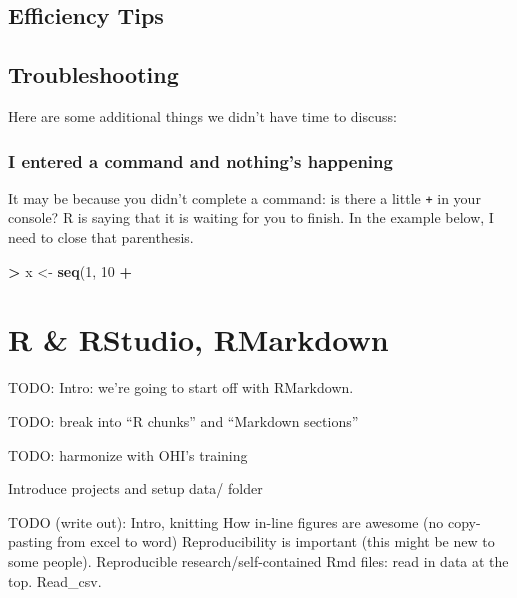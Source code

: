 \documentclass[]{book}
\newenvironment{Shaded}{\begin{snugshade}}{\end{snugshade}}
\newcommand{\DecValTok}[1]{\textcolor[rgb]{0.00,0.00,0.81}{#1}}
\newcommand{\KeywordTok}[1]{\textcolor[rgb]{0.13,0.29,0.53}{\textbf{#1}}}
\newcommand{\NormalTok}[1]{#1}
\newcommand{\OperatorTok}[1]{\textcolor[rgb]{0.81,0.36,0.00}{\textbf{#1}}}
\newcommand{\StringTok}[1]{\textcolor[rgb]{0.31,0.60,0.02}{#1}}
\begin{document}
\hypertarget{efficiency-tips}{%
\section{Efficiency Tips}\label{efficiency-tips}}

\hypertarget{troubleshooting}{%
\section{Troubleshooting}\label{troubleshooting}}

Here are some additional things we didn't have time to discuss:

\hypertarget{i-entered-a-command-and-nothings-happening}{%
\subsection{I entered a command and nothing's happening}\label{i-entered-a-command-and-nothings-happening}}

It may be because you didn't complete a command: is there a little \texttt{+} in your console? R is saying that it is waiting for you to finish. In the example below, I need to close that parenthesis.

\begin{Shaded}
\begin{Highlighting}[]
\OperatorTok{>}\StringTok{ }\NormalTok{x <-}\StringTok{ }\KeywordTok{seq}\NormalTok{(}\DecValTok{1}\NormalTok{, }\DecValTok{10}
\OperatorTok{+}\StringTok{ }
\end{Highlighting}
\end{Shaded}

\hypertarget{rstudio}{%
\chapter{R \& RStudio, RMarkdown}\label{rstudio}}

TODO: Intro: we're going to start off with RMarkdown.

TODO: break into ``R chunks'' and ``Markdown sections''

TODO: harmonize with OHI's training

Introduce projects and setup data/ folder

TODO (write out):
Intro, knitting
How in-line figures are awesome (no copy-pasting from excel to word)
Reproducibility is important (this might be new to some people). Reproducible research/self-contained Rmd files: read in data at the top. Read\_csv.
\end{document}
